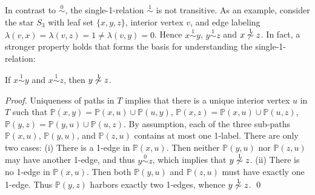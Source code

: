 \documentclass[smallextended]{svjour3}
\newcommand{\Ro}{\mathrel{\overset{0}{\sim}}}
\newcommand{\Rl}{\mathrel{\overset{1}{\sim}}}
\begin{document}
In contrast to $\Ro$, the single-1-relation $\Rl$ is not transitive.  As an
example, consider the star $S_3$ with leaf set $\{x,y,z\}$, interior
vertex $v$, and edge labeling $\lambda(v,x)=\lambda(v,z)=1\neq
\lambda(v,y)=0$.  Hence $x\Rl y$, $y\Rl z$ and $x\not \Rl z$. In fact, a
stronger property holds that forms the basis for understanding the
single-1-relation:
\begin{lemma}
  If $x\Rl y$ and $x\Rl z$, then $y\not\Rl z$.
	\label{lem:not-trans}
\end{lemma}
\begin{proof}
  Uniqueness of paths in $T$ implies that there is a unique interior vertex
  $u$ in $T$ such that
  $\mathbb{P}(x,y)=\mathbb{P}(x,u)\cup\mathbb{P}(u,y)$,
  $\mathbb{P}(x,z)=\mathbb{P}(x,u)\cup\mathbb{P}(u,z)$,
  $\mathbb{P}(y,z)=\mathbb{P}(y,u)\cup\mathbb{P}(u,z)$.  By assumption,
  each of the three sub-paths $\mathbb{P}(x,u)$, $\mathbb{P}(y,u)$, and
  $\mathbb{P}(z,u)$ contains at most one 1-label. There are only two cases:
  (i) There is a 1-edge in $\mathbb{P}(x,u)$. Then neither
  $\mathbb{P}(y,u)$ nor $\mathbb{P}(z,u)$ may have another 1-edge, and thus
  $y\Ro z$, which implies that $y\not\Rl z$. (ii) There is no 1-edge in
  $\mathbb{P}(x,u)$. Then both $\mathbb{P}(y,u)$ and $\mathbb{P}(z,u)$ must
  have exactly one 1-edge. Thus $\mathbb{P}(y,z)$ harbors exactly two
  1-edges, whence $y\not\Rl z$. \qed \end{proof}
\end{document}
